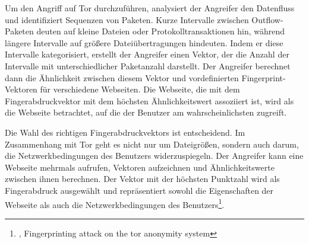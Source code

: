 Um den Angriff auf Tor durchzuführen, analysiert der Angreifer den Datenfluss und identifiziert Sequenzen von Paketen. Kurze Intervalle zwischen Outflow-Paketen deuten auf kleine Dateien oder Protokolltransaktionen hin, während längere Intervalle auf größere Dateiübertragungen hindeuten. Indem er diese Intervalle kategorisiert, erstellt der Angreifer einen Vektor, der die Anzahl der Intervalle mit unterschiedlicher Paketanzahl darstellt. Der Angreifer berechnet dann die Ähnlichkeit zwischen diesem Vektor und vordefinierten Fingerprint-Vektoren für verschiedene Webseiten. Die Webseite, die mit dem Fingerabdruckvektor mit dem höchsten Ähnlichkeitswert assoziiert ist, wird als die Webseite betrachtet, auf die der Benutzer am wahrscheinlichsten zugreift.

Die Wahl des richtigen Fingerabdruckvektors ist entscheidend. Im Zusammenhang mit Tor geht es nicht nur um Dateigrößen, sondern auch darum, die Netzwerkbedingungen des Benutzers widerzuspiegeln. Der Angreifer kann eine Webseite mehrmals aufrufen, Vektoren aufzeichnen und Ähnlichkeitswerte zwischen ihnen berechnen. Der Vektor mit der höchsten Punktzahl wird als Fingerabdruck ausgewählt und repräsentiert sowohl die Eigenschaften der Webseite als auch die Netzwerkbedingungen des Benutzers\footnote{\cite{FingerprintingOnTorAttack}, Fingerprinting attack on the tor anonymity system}.
